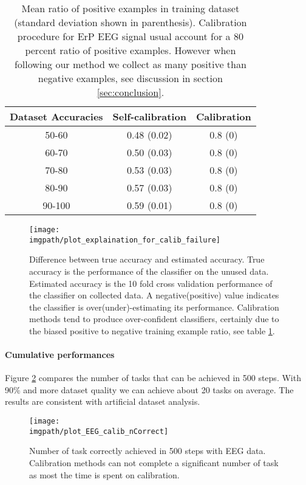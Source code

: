 \begin{table}
\begin{tabular}{c c c}
Dataset Accuracies & Self-calibration & Calibration \\ \hline
50-60 & 0.48 (0.02) & 0.8 (0) \\
60-70 & 0.50 (0.03) & 0.8 (0) \\
70-80 & 0.53 (0.03) & 0.8 (0) \\
80-90 & 0.57 (0.03) & 0.8 (0) \\
90-100 & 0.59 (0.01) & 0.8 (0) \\
\end{tabular}
\caption{Mean ratio of positive examples in training dataset (standard deviation shown in parenthesis). Calibration procedure for ErP EEG signal usual account for a 80 percent ratio of positive examples. However when following our method we collect as many positive than negative examples, see discussion in section \ref{sec:conclusion}.}
\label{tab:correctLabelRatio}
\end{table}

\begin{figure}[!h]
\centering
\texttt{[image: \\imgpath/plot\_explaination\_for\_calib\_failure]}
\caption{Difference between true accuracy and estimated accuracy. True accuracy is the performance of the classifier on the unused data. Estimated accuracy is the 10 fold cross validation performance of the classifier on collected data. A negative(positive) value indicates the classifier is over(under)-estimating its performance. Calibration methods tend to produce over-confident classifiers, certainly due to the biased positive to negative training example ratio, see table \ref{tab:correctLabelRatio}.}
\label{fig:calibFail}
\end{figure}

\paragraph{Cumulative performances}

Figure \ref{fig:nCorrectEEG} compares the number of tasks that can be achieved in 500 steps. With 90\% and more dataset quality we can achieve about 20 tasks on average. The results are consistent with artificial dataset analysis.

\begin{figure}[!h]
\centering
\texttt{[image: \\imgpath/plot\_EEG\_calib\_nCorrect]}
\caption{Number of task correctly achieved in 500 steps with EEG data. Calibration methods can not complete a significant number of task as most the time is spent on calibration.}
\label{fig:nCorrectEEG}
\end{figure} 

